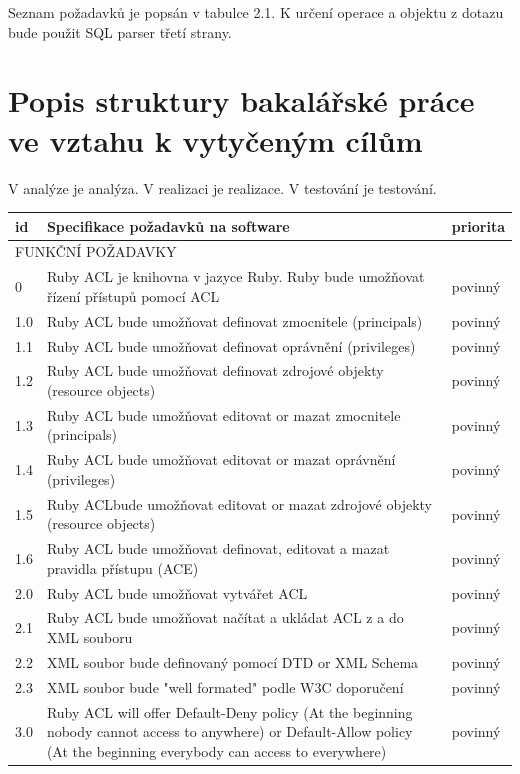 \documentclass[11pt,twoside,a4paper]{book}
\begin{document}
Seznam požadavků je popsán v tabulce 2.1.
K určení operace a objektu z dotazu bude použit SQL parser třetí strany.

\section{Popis struktury bakalářské práce ve vztahu k vytyčeným cílům}

V analýze je analýza.
V realizaci je realizace.
V testování je testování.

\begin{table}%
\begin{center}
\begin{tabular}{|l|p{9cm}|l|}
\hline
\textbf{id} & \textbf{Specifikace požadavků na software} & \textbf{priorita} \\
\hline
\multicolumn{3}{|l|}{FUNKČNÍ POŽADAVKY} \\
\hline
0 & Ruby ACL je knihovna v jazyce Ruby. Ruby bude umožňovat řízení přístupů pomocí ACL & povinný\\
\hline
1.0 & Ruby ACL bude umožňovat definovat zmocnitele (principals) & povinný\\
\hline
1.1 & Ruby ACL bude umožňovat definovat oprávnění (privileges) & povinný\\
\hline
1.2 & Ruby ACL bude umožňovat definovat  zdrojové objekty (resource objects) & povinný\\
\hline
1.3 & Ruby ACL bude umožňovat editovat or mazat zmocnitele (principals) & povinný\\
\hline
1.4 & Ruby ACL bude umožňovat editovat or mazat oprávnění (privileges) & povinný\\
\hline
1.5 & Ruby ACLbude umožňovat editovat or mazat zdrojové objekty (resource objects) & povinný\\
\hline
1.6 & Ruby ACL bude umožňovat definovat, editovat a mazat pravidla přístupu (ACE) & povinný\\
\hline
2.0 & Ruby ACL bude umožňovat vytvářet ACL & povinný\\
\hline
2.1 & Ruby ACL bude umožňovat načítat a ukládat ACL z a do XML souboru & povinný\\
\hline
2.2 & XML soubor bude definovaný pomocí DTD or XML Schema & povinný\\
\hline
2.3 & XML soubor bude "well formated" podle W3C doporučení & povinný\\
\hline
3.0 & Ruby ACL will offer Default-Deny policy (At the beginning nobody cannot access to anywhere) or Default-Allow policy (At the beginning everybody can access to everywhere) & povinný\\

\end{tabular}
\end{center}
\end{table}
\end{document}
